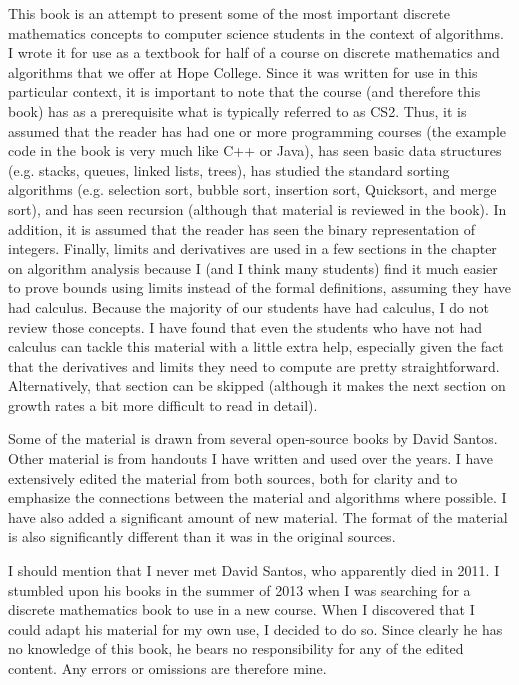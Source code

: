 This book is an attempt to present some of the most important discrete mathematics concepts
to computer science students in the context of algorithms.  I wrote it for use as a textbook
for half of a course on discrete mathematics and algorithms that we offer at Hope College.
Since it was written for use in this particular context,
it is important to note that the course (and therefore this book) 
has as a prerequisite what is typically referred to as CS2.
Thus, it is assumed that the reader has had one or more programming courses
(the example code in the book is very much like C++ or Java), 
has seen basic data structures (e.g. stacks, queues, linked lists, trees), 
has studied the standard sorting algorithms (e.g. selection sort, bubble sort,
insertion sort, Quicksort, and merge sort), 
and
has seen recursion (although that material is reviewed in the book). 
In addition, it is assumed that the reader has seen the binary representation of integers.
Finally, limits and derivatives are used in a few sections in the chapter on algorithm analysis
because I (and I think many students) find it much easier to prove bounds using limits
instead of the formal definitions, assuming they have had calculus. Because the majority of
our students have had calculus, I do not review those concepts. 
I have found that even the students who have not had calculus can tackle this material 
with a little extra help, especially given the fact that the derivatives and limits they need to 
compute are pretty straightforward. 
Alternatively, that section can be skipped 
(although it makes the next section on growth rates a bit more difficult to read in detail).

Some of the material is drawn from several open-source books by David Santos.
Other material is from handouts I have written and used over the years.  
I have extensively edited the material from both sources, 
both for clarity and to emphasize the connections
between the material and algorithms where possible.
I have also added a significant amount of new material.
The format of the material is also significantly different than it was in
the original sources.

I should mention that I never met David Santos, who apparently died in 2011. 
I stumbled upon his books in the summer  of 2013 when 
I was searching for a discrete mathematics book to use 
in a new course.  
When I discovered that I could adapt his material for my own use, I decided to do so.  
Since clearly he has no knowledge of this book, 
he bears no responsibility for any of the edited content.
Any errors or omissions are therefore mine.


